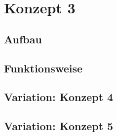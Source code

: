 \section{Konzept 3}

\subsection{Aufbau}

\subsection{Funktionsweise}

\subsection{Variation: Konzept 4}

\subsection{Variation: Konzept 5}
